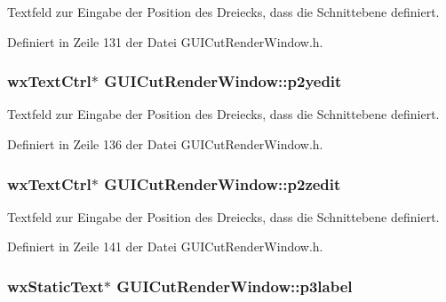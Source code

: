 Textfeld zur Eingabe der Position des Dreiecks, dass die Schnittebene definiert. 



Definiert in Zeile 131 der Datei G\-U\-I\-Cut\-Render\-Window.\-h.

\hypertarget{classGUICutRenderWindow_a8ec4550ec7d30a8ad3c4c1e5dfcb8dce}{
\subsubsection[{p2yedit}]{\setlength{\rightskip}{0pt plus 5cm}wx\-Text\-Ctrl$\ast$ G\-U\-I\-Cut\-Render\-Window\-::p2yedit\hspace{0.3cm}{\ttfamily [private]}}}\label{classGUICutRenderWindow_a8ec4550ec7d30a8ad3c4c1e5dfcb8dce}


Textfeld zur Eingabe der Position des Dreiecks, dass die Schnittebene definiert. 



Definiert in Zeile 136 der Datei G\-U\-I\-Cut\-Render\-Window.\-h.

\hypertarget{classGUICutRenderWindow_affad4d5ff6cf42dd585a1a5f0e050075}{
\subsubsection[{p2zedit}]{\setlength{\rightskip}{0pt plus 5cm}wx\-Text\-Ctrl$\ast$ G\-U\-I\-Cut\-Render\-Window\-::p2zedit\hspace{0.3cm}{\ttfamily [private]}}}\label{classGUICutRenderWindow_affad4d5ff6cf42dd585a1a5f0e050075}


Textfeld zur Eingabe der Position des Dreiecks, dass die Schnittebene definiert. 



Definiert in Zeile 141 der Datei G\-U\-I\-Cut\-Render\-Window.\-h.

\hypertarget{classGUICutRenderWindow_a6d1f742f0a78f84882f543f0cbbd6357}{
\subsubsection[{p3label}]{\setlength{\rightskip}{0pt plus 5cm}wx\-Static\-Text$\ast$ G\-U\-I\-Cut\-Render\-Window\-::p3label\hspace{0.3cm}{\ttfamily [private]}}}\label{classGUICutRenderWindow_a6d1f742f0a78f84882f543f0cbbd6357}



